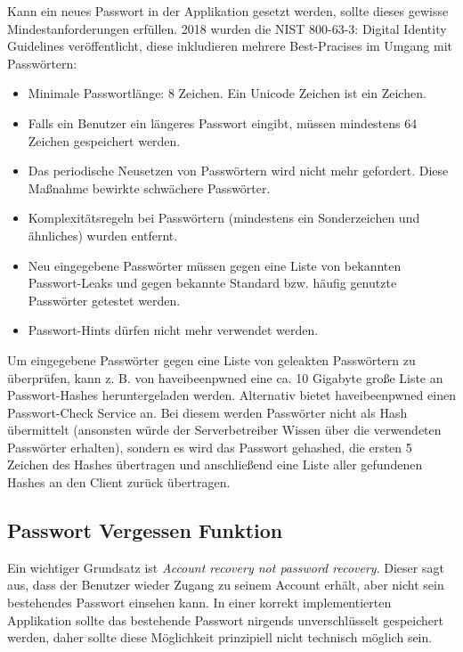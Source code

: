 Kann ein neues Passwort in der Applikation gesetzt werden, sollte dieses gewisse Mindestanforderungen erfüllen. 2018 wurden die NIST 800-63-3: Digital Identity Guidelines veröffentlicht, diese inkludieren mehrere Best-Pracises im Umgang mit Passwörtern:

\begin{itemize}
	\item Minimale Passwortlänge: 8 Zeichen. Ein Unicode Zeichen ist ein Zeichen.
	\item Falls ein Benutzer ein längeres Passwort eingibt, müssen mindestens 64 Zeichen gespeichert werden.
	\item Das periodische Neusetzen von Passwörtern wird nicht mehr gefordert. Diese Maßnahme bewirkte schwächere Passwörter.
	\item Komplexitätsregeln bei Passwörtern (mindestens ein Sonderzeichen und ähnliches) wurden entfernt.
	\item Neu eingegebene Passwörter müssen gegen eine Liste von bekannten Passwort-Leaks und gegen bekannte Standard bzw. häufig genutzte Passwörter getestet werden.
	\item Passwort-Hints dürfen nicht mehr verwendet werden.
\end{itemize}

Um eingegebene Passwörter gegen eine Liste von geleakten Passwörtern zu überprüfen, kann z. B. von haveibeenpwned eine ca. 10 Gigabyte große Liste an Passwort-Hashes heruntergeladen werden. Alternativ bietet haveibeenpwned einen Passwort-Check Service an. Bei diesem werden Passwörter nicht als Hash übermittelt (ansonsten würde der Serverbetreiber Wissen über die verwendeten Passwörter erhalten), sondern es wird das Passwort gehashed, die ersten 5 Zeichen des Hashes übertragen und anschließend eine Liste aller gefundenen Hashes an den Client zurück übertragen.

\subsection{Passwort Vergessen Funktion}

Ein wichtiger Grundsatz ist \textit{Account recovery not password recovery}. Dieser sagt aus, dass der Benutzer wieder Zugang zu seinem Account erhält, aber nicht sein bestehendes Passwort einsehen kann. In einer korrekt implementierten Applikation sollte das bestehende Passwort nirgends unverschlüsselt gespeichert werden, daher sollte diese Möglichkeit prinzipiell nicht technisch möglich sein.


